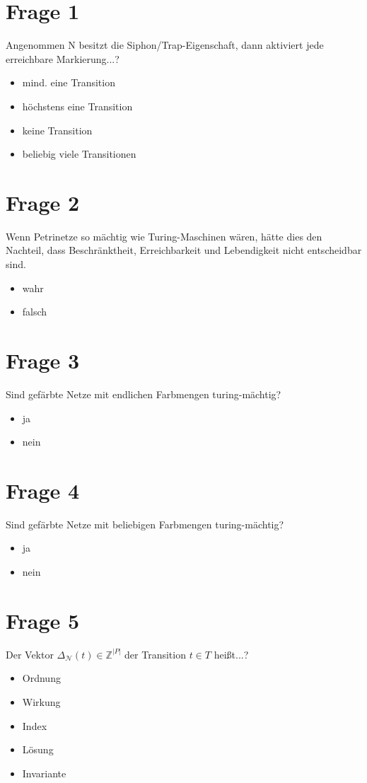 \documentclass[12pt]{article}
\begin{document}
\section*{Frage 1}
Angenommen N besitzt die Siphon/Trap-Eigenschaft, dann aktiviert jede erreichbare Markierung...?
\begin{itemize}
\item{mind. eine Transition}
\item{höchstens eine Transition}
\item{keine Transition}
\item{beliebig viele Transitionen}
\end{itemize}
\section*{Frage 2}
Wenn Petrinetze so mächtig wie Turing-Maschinen wären, hätte dies den Nachteil, dass Beschränktheit, Erreichbarkeit und Lebendigkeit nicht entscheidbar sind.
\begin{itemize}
\item{wahr}
\item{falsch}
\end{itemize}
\section*{Frage 3}
Sind gefärbte Netze mit endlichen Farbmengen turing-mächtig?
\begin{itemize}
\item{ja}
\item{nein}
\end{itemize}
\section*{Frage 4}
Sind gefärbte Netze mit beliebigen Farbmengen turing-mächtig?
\begin{itemize}
\item{ja}
\item{nein}
\end{itemize}
\section*{Frage 5}
Der Vektor $\Delta_{\mathcal{N}}(t)\in \mathds{Z}^{|P|}$ der Transition $t\in T$ heißt...?
\begin{itemize}
\item{Ordnung}
\item{Wirkung}
\item{Index}
\item{Lösung}
\item{Invariante}
\end{itemize}
\end{document}
